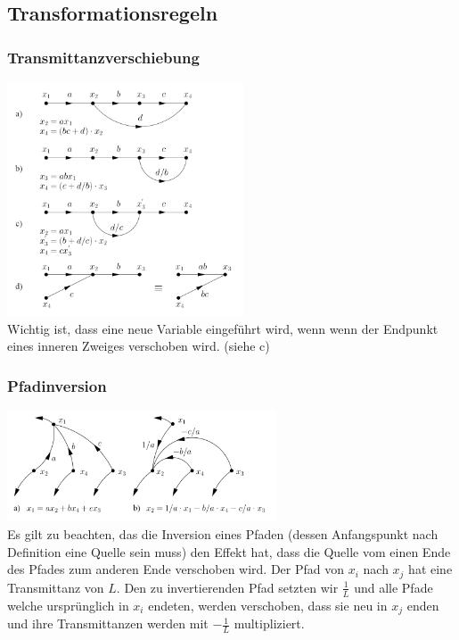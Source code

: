 \subsection{Transformationsregeln }
  \begin{multicols}{2}
    \subsubsection{Transmittanzverschiebung}
      \includegraphics[width=7cm]{./images/transmittanzverschiebung.png} \\
      Wichtig ist, dass eine neue Variable eingeführt wird, wenn wenn der Endpunkt eines
      inneren Zweiges verschoben wird. (siehe c)
      \vfill
  \columnbreak
  
    \subsubsection{Pfadinversion}
      \includegraphics[width=8cm]{./images/pfadinversion.png} \\
      Es gilt zu beachten, das die Inversion eines Pfaden (dessen Anfangspunkt nach Definition
      eine Quelle sein muss) den Effekt hat, dass die Quelle vom einen Ende des Pfades zum anderen
      Ende verschoben wird. Der Pfad von $x_i$ nach $x_j$ hat eine Transmittanz von $L$. 
      Den zu invertierenden Pfad setzten wir $\frac{1}{L}$ und alle Pfade welche ursprünglich in
      $x_i$ endeten, werden verschoben, dass sie neu in $x_j$ enden und ihre Transmittanzen werden
      mit $-\frac{1}{L}$ multipliziert.
      

\end{multicols}
